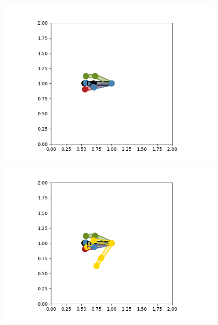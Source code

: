 \documentclass{article}
\begin{document}
\begin{figure}[htbp]
  \centering
  \begin{minipage}{0.45\textwidth}
    \includegraphics[width=\linewidth]{p1.2.ec3n.png}
    \caption{}
  \end{minipage}\hfill
  \begin{minipage}{0.45\textwidth}
    \includegraphics[width=\linewidth]{p1.2.ec5n.png}
    \caption{}
  \end{minipage}
  \begin{minipage}{0.45\textwidth}

\end{minipage}
\end{figure}
\end{document}
